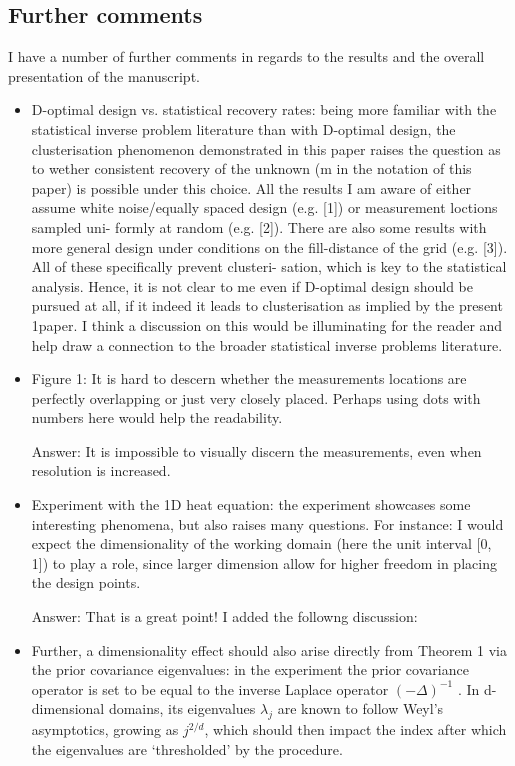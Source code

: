 \documentclass{amsart}
\begin{document}
\subsection{Further comments}
I have a number of further comments in regards to the results and the overall presentation of
the manuscript.
\begin{itemize}
\item D-optimal design vs. statistical recovery rates: being more
  familiar with the statistical inverse problem literature than with
  D-optimal design, the clusterisation phenomenon demonstrated in this
  paper raises the question as to wether consistent recovery of the
  unknown (m in the notation of this paper) is possible under this
  choice. All the results I am aware of either assume white
  noise/equally spaced design (e.g. [1]) or measurement loctions
  sampled uni- formly at random (e.g. [2]). There are also some
  results with more general design under conditions on the
  fill-distance of the grid (e.g. [3]). All of these specifically
  prevent clusteri- sation, which is key to the statistical
  analysis. Hence, it is not clear to me even if D-optimal design
  should be pursued at all, if it indeed it leads to clusterisation as
  implied by the present 1paper. I think a discussion on this would be
  illuminating for the reader and help draw a connection to the
  broader statistical inverse problems literature.

\item Figure 1: It is hard to descern whether the measurements
  locations are perfectly overlapping or just very closely
  placed. Perhaps using dots with numbers here would help the
  readability.

  Answer: It is impossible to visually discern the measurements, even
  when resolution is increased.

\item Experiment with the 1D heat equation: the experiment showcases
  some interesting phenomena, but also raises many questions. For
  instance: I would expect the dimensionality of the working domain
  (here the unit interval [0, 1]) to play a role, since larger
  dimension allow for higher freedom in placing the design points.

  Answer: That is a great point! I added the followng discussion: 

\item Further, a dimensionality effect should also arise directly from
  Theorem 1 via the prior covariance eigenvalues: in the experiment
  the prior covariance operator is set to be equal to the inverse
  Laplace operator $(−\Delta)^{−1}$ . In d-dimensional domains, its
  eigenvalues $\lambda_j$ are known to follow Weyl’s asymptotics,
  growing as $j^{2/d}$, which should then impact the index after
  which the eigenvalues are ‘thresholded’ by the procedure.


\end{itemize}
\end{document}
